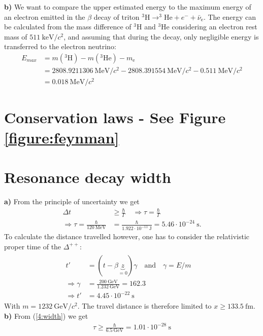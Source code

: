 \documentclass{article}
\begin{document}
\noindent \textbf{b)} We want to compare the upper estimated energy to the
maximum energy of an electron emitted in the \( \beta \) decay of triton
\( ^3 \text{H} \rightarrow ^3 \text{He} + e^- + \bar \nu _{\text{e}} \).
The energy can be calculated from the mass difference of \( ^3 \text{H} \)
and \( ^3 \text{He} \) considering an electron rest mass of \( 511
    \ \si{\kilo\electronvolt\per c^2}\), and assuming that during the
decay, only negligible energy is transferred to the electron neutrino:
\begin{align}
    E _{max} &= m(^3 \text{H} ) - m( ^3 \text{He} ) - m _{\text{e}}
    \nonumber\\ &=
    2808.9211306 \ \si{\mega\electronvolt\per c^2} - 2808.391554
    \ \si{\mega \electronvolt\per c^2} - 0.511 \ \si{\mega\electronvolt
	\per c^2} \nonumber \\ &= 0.018 \ \si{\mega\electronvolt\per c^2}
\end{align}

\section{Conservation laws - See Figure \ref{figure:feynman}}

\section{Resonance decay width}
\textbf{a)} From the principle of uncertainty we get
\begin{align}
    \label{4:width} \Delta t &\geq \frac{\hbar}{\Gamma} \quad
    \Rightarrow \tau = \frac{\hbar}{\Gamma} \\
    \Rightarrow \tau = \frac{\hbar}{120 \ \si{\mega\electronvolt}}
    &= \frac{\hbar}{1.922\cdot 10 ^{-11} \ \si{\joule}} = 5.46 \cdot 10 ^{-24}
    \ \si{\second}.
\end{align}
To calculate the distance travelled however, one has to consider the relativistic
proper time of the \( \Delta ^{++} \):
\begin{align}
    \begin{split}
    t' &= (t- \beta \underbrace{z}_{=0}) \gamma \quad \text{and} \quad \gamma = E/m
    \quad \\ \Rightarrow \gamma &= \frac{200 \
	\si{\giga\electronvolt}}{1.232 \ \si{\giga\electronvolt}} = 162.3 \\
    \Rightarrow t' &= 4.45 \cdot 10 ^{-22} \ \si{\second}
\end{split}
\end{align}
With \( m = 1232 \ \si{\giga\electronvolt\per c^2} \). 
The travel distance is therefore limited to
\( x \geq 133.5 \ \si{\femto\meter} \). \\
\textbf{b)}
From (\ref{4:width}) we get
\begin{align}
    \tau \geq \frac{\hbar}{6.5 \ \si{\giga\electronvolt}} = 1.01 \cdot 10 ^{-28}
    \ \si{\second} 
\end{align}
\end{document}

